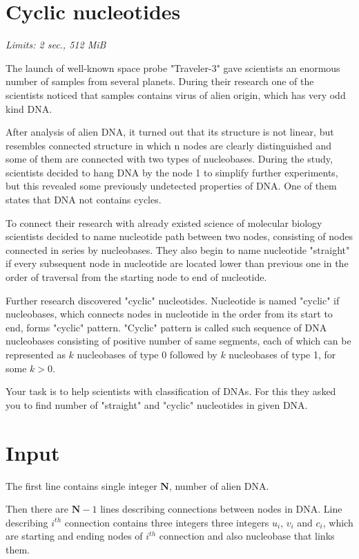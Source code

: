 \documentclass [11pt, a4paper, oneside, notitlepage] {article}
\begin{document}
\section*{Cyclic nucleotides}
\hspace{1cm}
\emph{Limits: 2 sec., 512 MiB}
\bigskip

The launch of well-known space probe "Traveler-3" gave scientists an enormous number of samples from several planets.
During their research one of the scientists noticed that samples contains virus of alien origin, which has very odd kind DNA.

After analysis of alien DNA, it turned out that its structure is not linear, but resembles connected structure in which n nodes are clearly distinguished and some of them are connected with two types of nucleobases. 
During the study, scientists decided to hang DNA by the node 1 to simplify further experiments, but this revealed some previously undetected properties of DNA. One of them states that DNA not contains cycles.

To connect their research with already existed science of molecular biology scientists decided to name nucleotide path between two nodes, consisting of nodes connected in series by nucleobases. 
They also begin to name nucleotide "straight" if every subsequent node in nucleotide are located lower than previous one in the order of traversal from the starting node to end of nucleotide.  

Further research discovered "cyclic" nucleotides. Nucleotide is named "cyclic" if nucleobases, which connects nodes in nucleotide in the order from its start to end, forms "cyclic" pattern.
"Cyclic" pattern is called such sequence of DNA nucleobases consisting of positive number of same segments, each of which can be represented as $k$ nucleobases of type 0 followed by $k$ nucleobases of type 1, for some $k > 0$.

Your task is to help scientists with classification of DNAs. For this they asked you to find number of "straight" and "cyclic" nucleotides in given DNA.

\section*{Input}

The first line contains single integer $\mathbf{N}$, number of alien DNA.

Then there are $\mathbf{N} - 1$ lines describing connections between nodes in DNA. 
Line describing $i^{th}$ connection contains three integers three integers $u_i$, $v_i$ and $c_i$, which are starting and ending nodes of $i^{th}$ connection and also nucleobase that links them.
\end{document}
